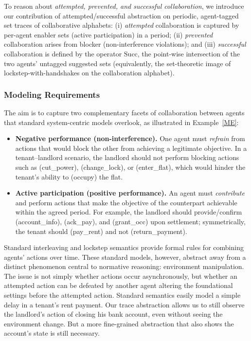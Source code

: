  To reason about \emph{attempted, prevented, and successful collaboration}, we introduce our contribution of attempted/successful
 abstraction on periodic, agent-tagged set traces of collaborative alphabets: (i) \emph{attempted} collaboration is captured by
 per-agent enabler sets (active participation) in a period; (ii) \emph{prevented} collaboration arises
 from blocker (non-interference violations); and (iii) \emph{successful} collaboration is defined by
 the operator \(\mathrm{Succ}\), the point-wise intersection of the two agents’ untagged suggested sets
 (equivalently, the set-theoretic image of lockstep-with-handshakes on the collaboration alphabet).
 
 \subsubsection{Modeling Requirements}
 \label{subsec:what-to-model}
 
 The aim is to capture two complementary facets of collaboration between agents that standard system-centric models overlook, as illustrated in Example~\ref{ME}:
 
 \begin{itemize}
 \item \textbf{Negative performance (non-interference).}
 One agent must \emph{refrain} from actions that would block the other from achieving a legitimate objective.
 In a tenant–landlord scenario, the landlord should not perform blocking actions such as
 (\textsf{cut\_power}), (\textsf{change\_lock}), or (\textsf{enter\_flat}), which would hinder the tenant’s ability to (\textsf{occupy}) the flat.
 
 \item \textbf{Active participation (positive performance).}
 An agent must \emph{contribute} and perform actions that make the objective of the counterpart achievable within the agreed period.
 For example, the landlord should provide/confirm (\textsf{account\_info}), (\textsf{ack\_pay}), and (\textsf{grant\_occ}) upon settlement; symmetrically, the tenant should (\textsf{pay\_rent}) and not (\textsf{return\_payment}).
 \end{itemize}
 
 Standard interleaving and lockstep semantics provide formal rules for combining agents’ actions over time. These standard models, however, abstract away from a distinct phenomenon central to normative reasoning: environment manipulation. The issue is not simply whether actions occur asynchronously, but whether an attempted action can be defeated by another agent altering the foundational settings before the attempted action. Standard semantics easily model a simple delay in a tenant's rent payment. Our trace abstraction allows us to still observe the landlord's action of closing his bank account, even without seeing the environment change. But a more fine-grained abstraction that also shows the account's state is still necessary.
 
